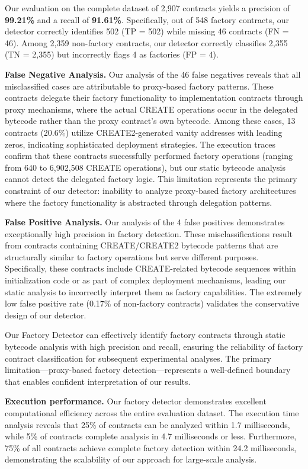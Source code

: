 Our evaluation on the complete dataset of 2,907 contracts yields a precision of \textbf{99.21\%} and a recall of \textbf{91.61\%}. Specifically, out of 548 factory contracts, our detector correctly identifies 502 (TP = 502) while missing 46 contracts (FN = 46). Among 2,359 non-factory contracts, our detector correctly classifies 2,355 (TN = 2,355) but incorrectly flags 4 as factories (FP = 4).

\textbf{False Negative Analysis.} Our analysis of the 46 false negatives reveals that all misclassified cases are attributable to proxy-based factory patterns. These contracts delegate their factory functionality to implementation contracts through proxy mechanisms, where the actual CREATE operations occur in the delegated bytecode rather than the proxy contract's own bytecode. Among these cases, 13 contracts (20.6\%) utilize CREATE2-generated vanity addresses with leading zeros, indicating sophisticated deployment strategies. The execution traces confirm that these contracts successfully performed factory operations (ranging from 640 to 6,902,508 CREATE operations), but our static bytecode analysis cannot detect the delegated factory logic. This limitation represents the primary constraint of our detector: inability to analyze proxy-based factory architectures where the factory functionality is abstracted through delegation patterns.

\textbf{False Positive Analysis.} Our analysis of the 4 false positives demonstrates exceptionally high precision in factory detection. These misclassifications result from contracts containing CREATE/CREATE2 bytecode patterns that are structurally similar to factory operations but serve different purposes. Specifically, these contracts include CREATE-related bytecode sequences within initialization code or as part of complex deployment mechanisms, leading our static analysis to incorrectly interpret them as factory capabilities. The extremely low false positive rate (0.17\% of non-factory contracts) validates the conservative design of our detector.

Our Factory Detector can effectively identify factory contracts through static bytecode analysis with high precision and recall, ensuring the reliability of factory contract classification for subsequent experimental analyses. The primary limitation—proxy-based factory detection—represents a well-defined boundary that enables confident interpretation of our results.

\textbf{Execution performance.} Our factory detector demonstrates excellent computational efficiency across the entire evaluation dataset. The execution time analysis reveals that 25\% of contracts can be analyzed within 1.7 milliseconds, while 5\% of contracts complete analysis in 4.7 milliseconds or less. Furthermore, 75\% of all contracts achieve complete factory detection within 24.2 milliseconds, demonstrating the scalability of our approach for large-scale analysis.


